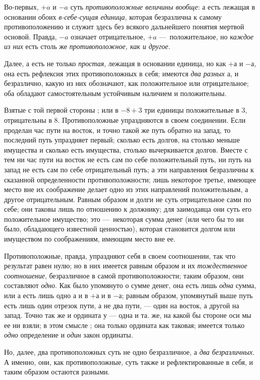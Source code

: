 Во-первых, $+a$ и $-a$
суть {\em противоположные величины вообще}:
$а$ есть лежащая в основании обоих
{\em в-себе-сущая единица}, которая безразлична к
самому противоположению и служит здесь без всякого дальнейшего понятия
мертвой основой. Правда, $-a$ означает
отрицательное, $+a$ —~положительное, но
{\em каждое из них} есть столь же
{\em противоположное, как и другое}.

Далее, $а$ есть не только
{\em простая}, лежащая в основании единица, но как
$+а$ и  $-а$, она есть
рефлексия этих противоположных в себя; имеются {\em два
разных $а$}, и безразлично, какую из них обозначают, как положительное или
отрицательное; оба обладают самостоятельным устойчивым наличием и
положительны.

Взятые с той первой стороны ; или в $-8+3$ три единицы положительные в 3,
отрицательны в 8. Противоположные упраздняются в своем соединении. Если
проделан час пути на восток, и точно такой же путь обратно на запад, то
последний путь упраздняет первый; сколько есть долгов, на столько меньше
имущества и сколько есть имущества, столько вычеркивается долгов. Вместе с
тем ни час пути на восток не есть сам по себе положительный путь, ни путь
на запад не есть сам по себе отрицательный путь; а эти направления
безразличны к сказанной определенности противоположности; лишь некоторое
третье, имеющее место вне их соображение делает одно из этих направлений
положительным, а другое отрицательным. Равным образом и долги не суть
отрицательное сами по себе; они таковы лишь по отношению к должнику; для
заимодавца они суть его положительное имущество; это —~некоторая сумма
денег (или чего бы то ни было, обладающего известной ценностью), которая
становится долгом или имуществом по соображениям, имеющим место вне ее.

Противоположные, правда, упраздняют себя в своем соотношении, так что
результат равен нулю; но в них имеется равным образом и их
{\em тождественное соотношение}, безразличное в самой
противоположности; таким образом, они составляют
{\em одно}. Как было упомянуто о сумме денег, она есть
лишь {\em одна} сумма, или $а$
есть лишь одно $а$ и в
$+а$ и в $-а$; равным
образом, упомянутый выше путь есть лишь один отрезок пути, а не два пути, —
один на восток, а другой на запад. Точно так же и ордината
$у$ — одна и та. же, на какой бы стороне оси мы ее ни
взяли; в этом смысле ; она только ордината как таковая; имеется только
{\em одно} определение и {\em один}
закон ординаты.

Но, далее, два противоположных суть не одно безразличное, а
{\em два безразличных}. А именно, они, как
противоположные, суть также и рефлектированные в себя, и таким образом
остаются разными.

